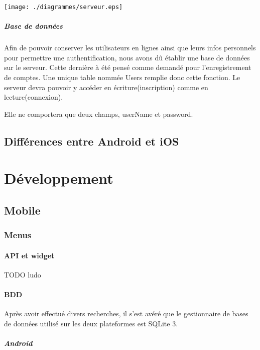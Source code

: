 \documentclass[a4paper,11pt]{report}
\begin{document}
			\begin{center}
					\texttt{[image: ./diagrammes/serveur.eps]}
			\end{center}
			
			
			\paragraph{Base de données\\}
			Afin de pouvoir conserver les utilisateurs en lignes ainsi que leurs infos
			personnels pour permettre une authentification, nous avons dû établir une
			base de données sur le serveur. Cette dernière à été pensé comme demandé pour 
			l'enregistrement de comptes. Une unique table nommée Users remplie donc cette
			fonction. Le serveur devra pouvoir y accéder en écriture(inscription) comme
			en lecture(connexion).
			
			Elle ne comportera que deux champs, userName et password.
						
	\section{Différences entre Android et iOS}
	


\chapter{Développement}
	\section{Mobile}
		\subsection{Menus}
			\subsubsection{API et widget}
			TODO ludo
		
		
			\subsubsection{BDD}
			Après avoir effectué divers recherches, il s'est avéré que le gestionnaire
			de bases de données utilisé sur les deux plateformes est SQLite 3. 
			
			\paragraph{Android\\}
			
\end{document}
